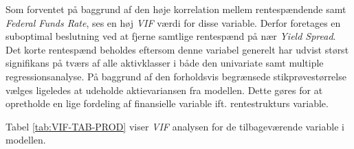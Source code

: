 \documentclass[
  a4paper,
  oneside]{memoir}
\begin{document}
\begin{table}[H]

\caption{\label{tab:VIF-TAB}Variance Inflation Factor analyse for det hidtidige system af variable.}
\centering
{}
\end{table}

Som forventet på baggrund af den høje korrelation mellem rentespændende samt \emph{Federal Funds Rate}, ses en høj \emph{VIF} værdi for disse variable. Derfor foretages en suboptimal beslutning ved at fjerne samtlige rentespænd på nær \emph{Yield Spread}. Det korte rentespænd beholdes eftersom denne variabel generelt har udvist størst signifikans på tværs af alle aktivklasser i både den univariate samt multiple regressionsanalyse. På baggrund af den forholdsvis begrænsede stikprøvestørrelse vælges ligeledes at udeholde aktievariansen fra modellen. Dette gøres for at opretholde en lige fordeling af finansielle variable ift. rentestrukturs variable.

Tabel \ref{tab:VIF-TAB-PROD} viser \emph{VIF} analysen for de tilbageværende variable i modellen.
\end{document}
